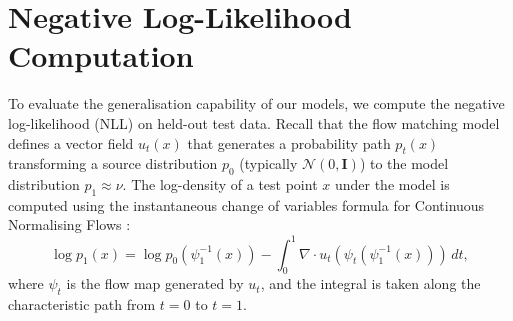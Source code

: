 \documentclass{article} %
\begin{document}
\begin{table}[h]
\centering
\caption{\textbf{Comparison between FM and CDC-FM on LiDAR landscape after 16k epochs.}}

\label{tab: lidar 16k}
\end{table}


\section{Negative Log-Likelihood Computation}\label{sec:nll_appendix}

To evaluate the generalisation capability of our models, we compute the negative log-likelihood (NLL) on held-out test data. 
Recall that the flow matching model defines a vector field $u_t(x)$ that generates a probability path $p_t(x)$ transforming a source distribution $p_0$ (typically $\mathcal{N}(0,\mathbf{I})$) to the model distribution $p_1 \approx \nu$.
The log-density of a test point $x$ under the model is computed using the instantaneous change of variables formula for Continuous Normalising Flows \citep{chen_neural_2019}:
%
\begin{equation}
    \log p_1(x) = \log p_0(\psi_1^{-1}(x)) - \int_0^1 \nabla \cdot u_t(\psi_t(\psi_1^{-1}(x))) \, dt,
\end{equation}
%
where $\psi_t$ is the flow map generated by $u_t$, and the integral is taken along the characteristic path from $t=0$ to $t=1$.
\end{document}
